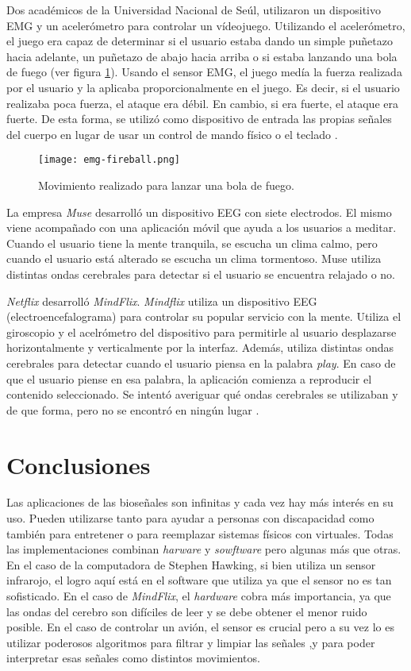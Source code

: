 Dos académicos de la Universidad Nacional de Seúl, utilizaron un dispositivo EMG y un acelerómetro para controlar un vídeojuego. Utilizando el acelerómetro, el juego era capaz de determinar si el usuario estaba dando un simple puñetazo hacia adelante, un puñetazo de abajo hacia arriba o si estaba lanzando una bola de fuego (ver 
figura \ref{fig:fireball}). Usando el sensor EMG, el juego medía la fuerza realizada por el usuario y la aplicaba proporcionalmente en el juego. Es decir, si el usuario realizaba poca fuerza, el ataque era débil. En cambio, si era fuerte, el ataque era fuerte. De esta forma, se utilizó como dispositivo de entrada las propias señales del cuerpo en lugar de usar un control de mando físico o el teclado \cite{emg-fireball}.

\begin{figure}[H]
    \texttt{[image: emg-fireball.png]}
    \caption{Movimiento realizado para lanzar una bola de fuego.}
	\label{fig:fireball}
\end{figure}

La empresa \emph{Muse} desarrolló un dispositivo EEG con siete electrodos. El mismo viene acompañado con una aplicación móvil que ayuda a los usuarios a meditar. Cuando el usuario tiene la mente tranquila, se escucha un clima calmo, pero cuando el usuario está alterado se escucha un clima tormentoso. Muse utiliza distintas ondas cerebrales para detectar si el usuario se encuentra relajado o no.

\emph{Netflix} desarrolló \emph{MindFlix}. \emph{Mindflix} utiliza un dispositivo EEG (electroencefalograma) para controlar su popular servicio con la mente. Utiliza el giroscopio y el acelrómetro del dispositivo para permitirle al usuario desplazarse horizontalmente y verticalmente por la interfaz. Además, utiliza distintas ondas cerebrales para detectar cuando el usuario piensa en la palabra \emph{play}. En caso de que el usuario piense en esa palabra,  la aplicación comienza a reproducir el contenido seleccionado. Se intentó averiguar qué ondas cerebrales se utilizaban y de que forma, pero no se encontró en ningún lugar \cite{mindflix}.


\section{Conclusiones}

Las aplicaciones de las bioseñales son infinitas y cada vez hay más interés en su uso. Pueden utilizarse tanto para ayudar a personas con discapacidad como también para entretener o para reemplazar sistemas físicos con virtuales. Todas las implementaciones combinan \emph{harware} y \emph{sowftware} pero algunas más que otras. En el caso de la computadora de Stephen Hawking, si bien utiliza un sensor infrarojo, el logro aquí está en el software que utiliza ya que el sensor no es tan sofisticado. En el caso de \emph{MindFlix}, el \emph{hardware} cobra más importancia, ya que las ondas del cerebro son difíciles de leer y se debe obtener el menor ruido posible. En el caso de controlar un avión, el sensor es crucial pero a su vez lo es utilizar poderosos algoritmos para filtrar y limpiar las señales ,y para poder interpretar esas señales como distintos movimientos.


